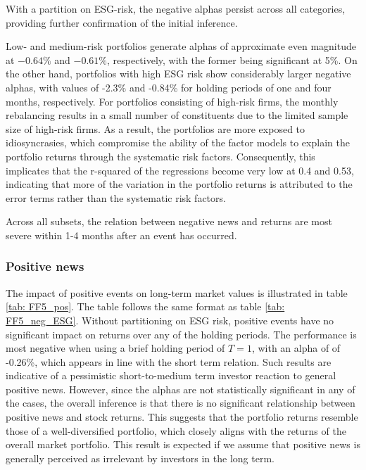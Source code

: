 With a partition on ESG-risk, the negative alphas persist across all categories,  providing further confirmation of the initial inference. 

Low- and medium-risk portfolios generate alphas of approximate even magnitude at $-0.64\%$ and $-0.61\%$, respectively, with the former being significant at 5\%. On the other hand, portfolios with high ESG risk show considerably larger negative alphas, with values of -2.3\% and -0.84\% for holding periods of one and four months, respectively. For portfolios consisting of high-risk firms, the monthly rebalancing results in a small number of constituents due to the limited sample size of high-risk firms. As a result, the portfolios are more exposed to idiosyncrasies, which compromise the ability of the factor models to explain the portfolio returns through the systematic risk factors. Consequently, this implicates that the r-squared of the regressions become very low at 0.4 and 0.53, indicating that more of the variation in the portfolio returns is attributed to the error terms rather than the systematic risk factors. 

Across all subsets, the relation between negative news and returns are most severe within 1-4 months after an event has occurred.

\subsubsection{Positive news}

The impact of positive events on long-term market values is illustrated in table \ref{tab: FF5_pos}. The table follows the same format as table \ref{tab: FF5_neg_ESG}. Without partitioning on ESG risk, positive events have no significant impact on returns over any of the holding periods. The performance is most negative when using a brief holding period of $T=1$, with an alpha of of -0.26\%, which appears in line with the short term relation. Such results are indicative of a pessimistic short-to-medium term investor reaction to general positive news. However, since the alphas are not statistically significant in any of the cases, the overall inference is that there is no significant relationship between positive news and stock returns. This suggests that the portfolio returns resemble those of a well-diversified portfolio, which closely aligns with the returns of the overall market portfolio. This result is expected if we assume that positive news is generally perceived as irrelevant by investors in the long term.

